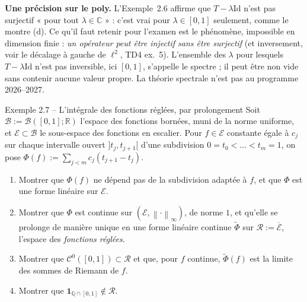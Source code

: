 \documentclass[11pt,a4paper]{article}
\newcommand{\R}{\mathbb{R}}
\newcommand{\Q}{\mathbb{Q}}
\newcommand{\C}{\mathbb{C}}
\newcommand{\adh}[1]{\overline{#1}}
\newcommand{\norm}[1]{\left\|#1\right\|}
\newcommand{\Cz}{\mathcal{C}^0}
\theoremstyle{definition}
\begin{document}
\begin{commentaire}
\textbf{Une précision sur le poly.} L'Exemple~2.6 affirme que $T-\lambda\mathrm{Id}$ n'est pas surjectif « pour tout $\lambda\in\C$ » : c'est vrai pour $\lambda\in[0,1]$ seulement, comme le montre (d). Ce qu'il faut retenir pour l'examen est le phénomène, impossible en dimension finie : \emph{un opérateur peut être injectif sans être surjectif} (et inversement, voir le décalage à gauche de $\ell^2$, TD4 ex.~5). L'ensemble des $\lambda$ pour lesquels $T-\lambda\mathrm{Id}$ n'est pas inversible, ici $[0,1]$, s'appelle le spectre ; il peut être non vide sans contenir aucune valeur propre. La théorie spectrale n'est pas au programme 2026--2027.
\end{commentaire}

\begin{exo}{Exemple 2.7 -- L'intégrale des fonctions réglées, par prolongement}
Soit $\mathcal B:=\mathcal B([0,1];\R)$ l'espace des fonctions bornées, muni de la norme uniforme, et $\mathcal E\subset\mathcal B$ le sous-espace des fonctions en escalier. Pour $f\in\mathcal E$ constante égale à $c_j$ sur chaque intervalle ouvert $]t_j,t_{j+1}[$ d'une subdivision $0=t_0<\dots<t_m=1$, on pose $\Phi(f):=\sum_{j<m}c_j(t_{j+1}-t_j)$.
\begin{enumerate}[label=(\alph*)]
  \item Montrer que $\Phi(f)$ ne dépend pas de la subdivision adaptée à $f$, et que $\Phi$ est une forme linéaire sur $\mathcal E$.
  \item Montrer que $\Phi$ est continue sur $(\mathcal E,\norm\cdot_\infty)$, de norme $1$, et qu'elle se prolonge de manière unique en une forme linéaire continue $\widetilde\Phi$ sur $\mathcal R:=\adh{\mathcal E}$, l'espace des \emph{fonctions réglées}.
  \item Montrer que $\Cz([0,1])\subset\mathcal R$ et que, pour $f$ continue, $\widetilde\Phi(f)$ est la limite des sommes de Riemann de $f$.
  \item Montrer que $\mathbf 1_{\Q\cap[0,1]}\notin\mathcal R$.
\end{enumerate}
\end{exo}
\end{document}
